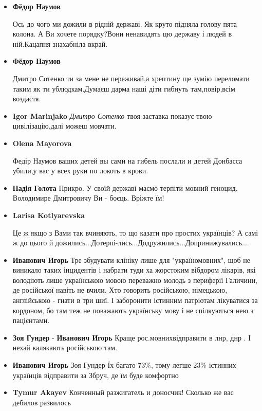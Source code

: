 \begin{itemize}
\item \textbf{Фёдор Наумов}

Ось до чого ми дожили в рідній державі. Як круто підняла голову пята колона. А
Ви хочете порядку?Вони ненавидять цю державу і людей в
ній.Кацапня знахабніла вкрай.

\item \textbf{Фёдор Наумов}

Дмитро Сотенко ти за мене не переживай,а хрептину ще зумію переломати таким як
ти ублюдкам.Думаєш дарма наші діти гибнуть там,повір,всім воздастя.

\item \textbf{Igor Marinjako}
\emph{Дмитро Сотенко} твоя заставка показує твою цивілізацію,далі можеш мовчати.

\item \textbf{Olena Mayorova}

Федір Наумов ваших детей вы сами на гибель послали и детей Донбасса убили,у вас у всех руки по локоть в крови.

\item \textbf{Надія Голота}
Прикро. У своїй державі маємо терпіти мовний геноцид. Володимире Дмитровичу Ви - боєць. Вріжте їм!

\item \textbf{Larisa Kotlyarevska}

Це ж якщо з Вами так вчиняють, то що казати про простих українців? А самі ж до
цього й дожились...Дотерпі-лись...Додружились...Допринижувались...

\item \textbf{Иванович Игорь}
Тре збудувати клініку лише для "україномовних", щоб не виникало таких
інцидентів і набрати туди ха жорстоким вібдором лікарів, які
володіють лише українською мовою переважно молодь з периферії
Галичини, де російської навіть не вчили. Хто говорить
російською, німецькою, англійською - гнати в три шиї. І
заборонити істинним патріотам лікуватися за кордоном, бо там
теж не поважають українську мову і не спілкуються нею з
пацієнтами.

\item \textbf{Зоя Гундер} - \textbf{Иванович Игорь}
Краще рос.мовнихвідправити в лнр, днр
. І нехай калякають російською там.

\item \textbf{Иванович Игорь}
Зоя Гундер
Їх багато 73\%, тому легше 23\% істинних українців відправити за Збруч, де їм буде комфортно

\item \textbf{Tymur Akayev}
Конченный разжигатель и доносчик! Сколько же вас дебилов развилось


\end{itemize}
